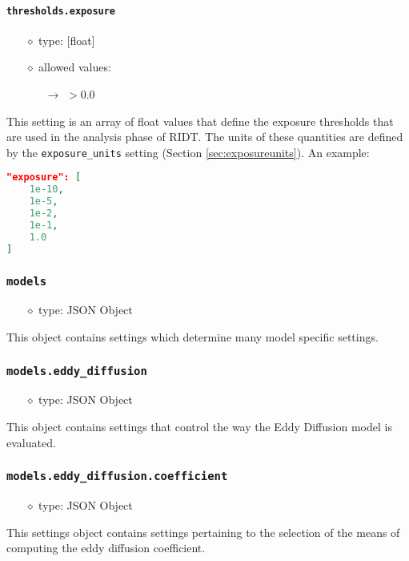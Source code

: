 \documentclass[]{article}
\def\code#1{\texttt{#1}}
\begin{document}
\paragraph{\code{thresholds.exposure}}\label{sec:exposurethresholds}
\begin{itemize}
    \item[$\diamond$] type: [float] 
    \item[$\diamond$] allowed values:
    \begin{itemize}
        \item[$\rightarrow$] $>0.0$
    \end{itemize}
\end{itemize}
This setting is an array of float values that define the exposure
thresholds that are used in the analysis phase of RIDT. The units of these
quantities are defined by the \code{exposure\_units} setting (Section
\ref{sec:exposureunits}). An example:\\
\begin{lstlisting}[language=json,firstnumber=1]
"exposure": [
    1e-10,
    1e-5,
    1e-2,
    1e-1,
    1.0
]
\end{lstlisting}

\subsubsection{\code{models}}
\begin{itemize}
    \item[$\diamond$] type: JSON Object 
\end{itemize}
This object contains settings which determine many model specific settings.

\subsubsection{\code{models.eddy\_diffusion}}
\begin{itemize}
    \item[$\diamond$] type: JSON Object 
\end{itemize}
This object contains settings that control the way the Eddy Diffusion model is
evaluated.

\subsubsection{\code{models.eddy\_diffusion.coefficient}}
\begin{itemize}
    \item[$\diamond$] type: JSON Object 
\end{itemize}
This settings object contains settings pertaining to the selection of the means
of computing the eddy diffusion coefficient.
\end{document}

